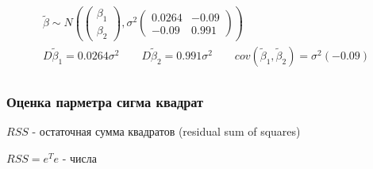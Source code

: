 \documentclass{article}
\begin{document}
\begin{eg}
  \begin{gather*}
    \tilde{\beta} \sim N\left(\begin{pmatrix}
      \beta_1 \\ \beta_2
    \end{pmatrix}, \sigma^{2}\begin{pmatrix}
    0.0264 & -0.09 \\ 
    -0.09 & 0.991 
    \end{pmatrix}\right) \\ 
    D\tilde{\beta}_1 = 0.0264\sigma^{2} \qquad 
    D\tilde{\beta}_2 = 0.991\sigma^{2} \qquad
    cov(\tilde{\beta}_1,\tilde{\beta}_2)=\sigma^{2}(-0.09) \\ 
  \end{gather*}
\end{eg}
\subsubsection{Оценка парметра сигма квадрат}
$RSS$ - остаточная сумма квадратов (residual sum of squares)

$RSS=e^{T}e$ - числа
\end{document}
